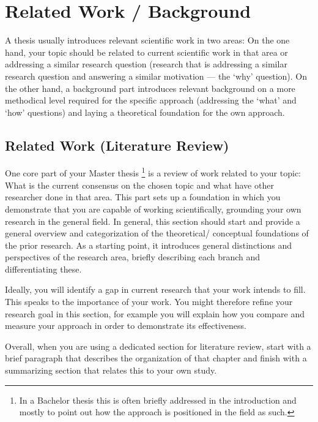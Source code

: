 \chapter{Related Work / Background}
A thesis usually introduces relevant scientific work in two areas: On the one hand, your topic should be related to current scientific work in that area or addressing a similar research question (research that is addressing a similar research question and answering a similar motivation --- the `why' question). On the other hand, a background part introduces relevant background on a more methodical level required for the specific approach (addressing the `what' and `how' questions) and laying a theoretical foundation for the own approach.

\section{Related Work (Literature Review)}
One core part of your Master thesis \footnote{In a Bachelor thesis this is often briefly addressed in the introduction and mostly to point out how the approach is positioned in the field as such.} is a review of work related to your topic: What is the current consensus on the chosen topic and what have other researcher done in that area. This part sets up a foundation in which you demonstrate that you are capable of working scientifically, grounding your own research in the general field. In general, this section should start and provide a general overview and categorization of the theoretical/ conceptual foundations of the prior research. As a starting point, it introduces general distinctions and perspectives of the research area, briefly describing each branch and differentiating these. 

Ideally, you will identify a gap in current research that your work intends to fill. This speaks to the importance of your work. You might therefore refine your research goal in this section, for example you will explain how you compare and measure your approach in order to demonstrate its effectiveness. 

Overall, when you are using a dedicated section for literature review, start with a brief paragraph that describes the organization of that chapter and finish with a summarizing section that relates this to your own study.

